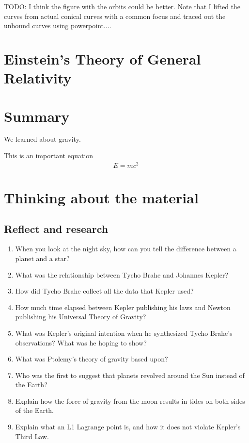 TODO: I think the figure with the orbits could be better. Note that I lifted the curves from actual conical curves with a common focus and traced out the unbound curves using powerpoint....

\section{Einstein's Theory of General Relativity}

\newpage
\section{Summary}

\begin{chapterSummary}
We learned about gravity.
\end{chapterSummary}

\newpage
\begin{importantEquations}
This is an important equation
\begin{align*}
E = mc^2
\end{align*}

\end{importantEquations}


\newpage
\section{Thinking about the material}
\subsection{Reflect and research}

\begin{enumerate}
\item When you look at the night sky, how can you tell the difference between a planet and a star?
\item What was the relationship between Tycho Brahe and Johannes Kepler?
\item How did Tycho Brahe collect all the data that Kepler used?
\item How much time elapsed between Kepler publishing his laws and Newton publishing his Universal Theory of Gravity?
\item What was Kepler's original intention when he synthesized Tycho Brahe's observations? What was he hoping to show?
\item What was Ptolemy's theory of gravity based upon?
\item Who was the first to suggest that planets revolved around the Sun instead of the Earth?
\item Explain how the force of gravity from the moon results in tides on both sides of the Earth.
\item Explain what an L1 Lagrange point is, and how it does not violate Kepler's Third Law.
\end{enumerate}
